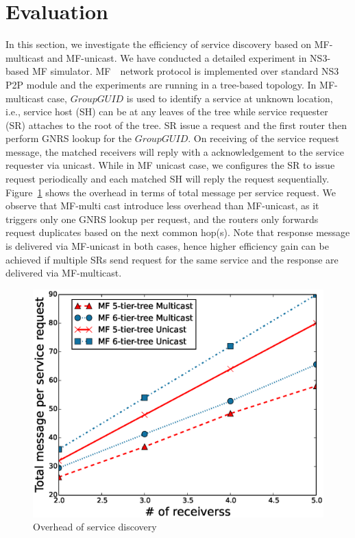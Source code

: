 \section{Evaluation}
In this section, we investigate the efficiency of service discovery based on MF-multicast and MF-unicast. We have conducted a detailed experiment in NS3-based MF simulator.  MF　network protocol is implemented over standard NS3 P2P module and the experiments are running in a tree-based topology. In MF-multicast case, $Group GUID$ is used to identify a service at unknown location, i.e., service host (SH) can be at any leaves of the tree while service requester (SR) attaches to the root of the tree. SR issue a request and the first router then perform  GNRS lookup for the $Group GUID$. On receiving of the service request message, the matched receivers will reply with a acknowledgement to the service requester via unicast. While in MF unicast case, we configures the SR to issue request periodically and each matched SH will reply the request sequentially. Figure~\ref{fig:mf_over} shows the overhead in terms of total message per service request. We observe that MF-multi cast introduce less overhead than MF-unicast, as it triggers only one GNRS lookup per request, and the routers only forwards request duplicates based on the next common hop(s). Note that response message is delivered via MF-unicast in both cases, hence higher efficiency gain can be achieved if multiple  SRs send request for the same service and the response are delivered via MF-multicast. 
     
\begin{figure}
\includegraphics[width=\columnwidth]{figure/multicast_mf_overhead.eps}
\caption{\label{fig:mf_over}Overhead of service discovery}
\end{figure}

